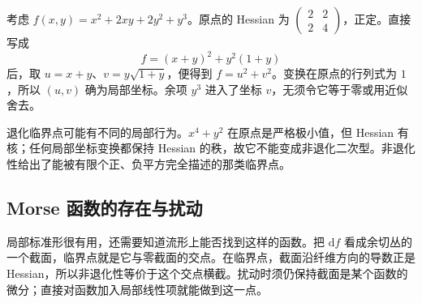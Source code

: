 \begin{example}\label{g2:exm:morse-coordinate-completion}
	考虑 \(f(x,y)=x^2+2xy+2y^2+y^3\)。原点的 Hessian 为 \(\left(\begin{smallmatrix}2&2\\2&4\end{smallmatrix}\right)\)，正定。直接写成
	\[
		f=(x+y)^2+y^2(1+y)
	\]
	后，取 \(u=x+y\)、\(v=y\sqrt{1+y}\)，便得到 \(f=u^2+v^2\)。变换在原点的行列式为 \(1\)，所以 \((u,v)\) 确为局部坐标。余项 \(y^3\) 进入了坐标 \(v\)，无须令它等于零或用近似舍去。
\end{example}

退化临界点可能有不同的局部行为。\(x^4+y^2\) 在原点是严格极小值，但 Hessian 有核；任何局部坐标变换都保持 Hessian 的秩，故它不能变成非退化二次型。非退化性给出了能被有限个正、负平方完全描述的那类临界点。

\subsection{Morse 函数的存在与扰动}
\label{g2:subsec:1701:03}

局部标准形很有用，还需要知道流形上能否找到这样的函数。把 \(\mathrm df\) 看成余切丛的一个截面，临界点就是它与零截面的交点。在临界点，截面沿纤维方向的导数正是 Hessian，所以非退化性等价于这个交点横截。扰动时须仍保持截面是某个函数的微分；直接对函数加入局部线性项就能做到这一点。

